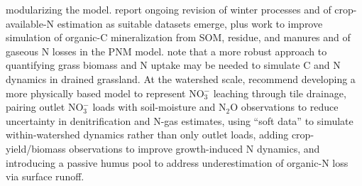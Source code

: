 \documentclass[11pt]{article}
\begin{document}
modularizing the model. \textcite{Marjerison2016} report ongoing revision of winter processes and of crop-available-N estimation as suitable datasets emerge, plus work to improve simulation of organic-C mineralization from SOM, residue, and manures and of gaseous N losses in the PNM model. \textcite{Bechtold2007} note that a more robust approach to quantifying grass biomass and N uptake may be needed to simulate C and N dynamics in drained grassland. At the watershed scale, \textcite{Qi2025} recommend developing a more physically based model to represent NO$_3^-$ leaching through tile drainage, pairing outlet NO$_3^-$ loads with soil-moisture and N$_2$O observations to reduce uncertainty in denitrification and N-gas estimates, using ``soft data'' to simulate within-watershed dynamics rather than only outlet loads, adding crop-yield/biomass observations to improve growth-induced N dynamics, and introducing a passive humus pool to address underestimation of organic-N loss via surface runoff.
\end{document}
